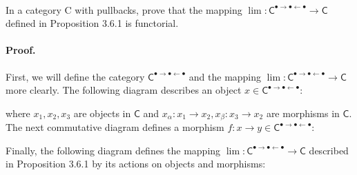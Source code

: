 \documentclass[../../main]{subfiles}
\begin{document}
	
	\paragraph{} 
	
	\begin{exercise}
	In a category \textsf{C} with pullbacks, prove that the mapping $ \lim: \mathsf{C}^{\bullet\rightarrow\bullet\leftarrow\bullet} \to \mathsf{C} $ defined in Proposition 3.6.1 is functorial. 
\end{exercise}
	
	\paragraph{Proof.} 
	
	First, we will define the category $ \mathsf{C} ^{\bullet\rightarrow\bullet\leftarrow\bullet} $ and the mapping $ \lim: \mathsf{C}^{\bullet\rightarrow\bullet\leftarrow\bullet} \to \mathsf{C} $ more clearly. The following diagram describes an object $ x \in \mathsf{C}^{\bullet\rightarrow\bullet\leftarrow\bullet}: $
	
	\begin{center}\end{center}

	\noindent where $ x_1, x_2, x_3 $ are objects in $ \mathsf{C} $ and $ x_\alpha: x_1 \to x_2, x_\beta: x_3 \to x_2 $ are morphisms in $ \mathsf{C} $. The next commutative diagram defines a morphism $ f: x \to y \in \mathsf{C}^{\bullet\rightarrow\bullet\leftarrow\bullet}: $
	
	\begin{center}\end{center}

	\noindent Finally, the following diagram defines the mapping $ \lim: \mathsf{C}^{\bullet\rightarrow\bullet\leftarrow\bullet} \to \mathsf{C} $ described in Proposition 3.6.1 by its actions on objects and morphisms:
	 
\end{document}
